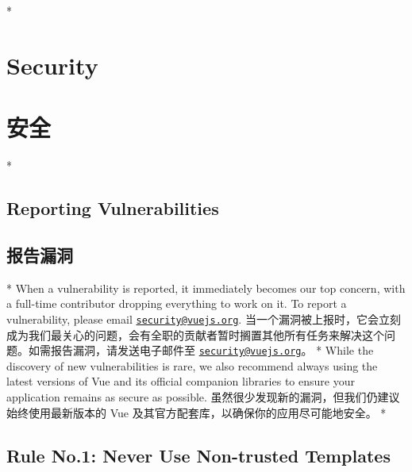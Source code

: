 
\begin{paracol}{2} 
\switchcolumn[0]*%
\section{Security}
\switchcolumn
\section{安全}
\switchcolumn[0]*%
\subsection{Reporting Vulnerabilities}
\switchcolumn
\subsection{报告漏洞}
\switchcolumn[0]*%
When a vulnerability is reported, it immediately becomes our top
concern, with a full-time contributor dropping everything to work on it.
To report a vulnerability, please email
\href{mailto:security@vuejs.org}{\nolinkurl{security@vuejs.org}}.
\switchcolumn
当一个漏洞被上报时，它会立刻成为我们最关心的问题，会有全职的贡献者暂时搁置其他所有任务来解决这个问题。如需报告漏洞，请发送电子邮件至
\href{mailto:security@vuejs.org}{\nolinkurl{security@vuejs.org}}。
\switchcolumn[0]*%
While the discovery of new vulnerabilities is rare, we also recommend
always using the latest versions of Vue and its official companion
libraries to ensure your application remains as secure as possible.
\switchcolumn
虽然很少发现新的漏洞，但我们仍建议始终使用最新版本的 Vue
及其官方配套库，以确保你的应用尽可能地安全。
\switchcolumn[0]*%
\subsection{Rule No.1: Never Use Non-trusted Templates}
\switchcolumn

\end{paracol}
